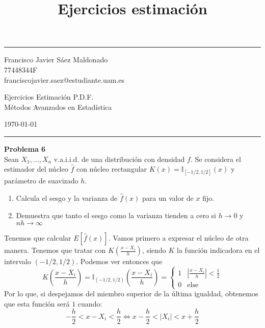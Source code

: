 \documentclass[11pt]{article}
\title{Ejercicios estimación }
\newenvironment{problem}[2][Problema]
    { \begin{mdframed}[backgroundcolor=gray!20] \textbf{#1 #2} \\}
    {  \end{mdframed}}
\begin{document}
    

\fancyhead[C]{}
\hrule \medskip %
\begin{minipage}{0.295\textwidth}
\raggedright
\footnotesize
Francisco Javier Sáez Maldonado \hfill\\
77448344F \hfill\\
franciscojavier.saez@estudiante.uam.es
\end{minipage}
\begin{minipage}{0.4\textwidth}
\centering
\large
Ejercicios Estimación P.D.F.\\
\normalsize
Métodos Avanzados en Estadística\\
\end{minipage}
\begin{minipage}{0.295\textwidth}
\raggedleft
\today\hfill\\
\end{minipage}
\medskip\hrule
\bigskip

    
    \begin{problem}{6}

    
    Sean \(X_1,\dots,X_n\) v.a.i.i.d. de una distribución con densidad
\(f\). Se considera el estimador del núcleo \(\hat{f}\) con núcleo
rectangular \(K(x) = \mathbb I_{[-1/2,1/2]}(x)\) y parámetro de
suavizado \(h\).

\begin{enumerate}
\item Calcula el sesgo y la varianza de \(\hat f(x)\) para un valor de \(x\)
fijo.

\item Demuestra que tanto el sesgo como la varianza tienden a cero si
\(h\to 0\) y \(nh\to \infty\)
\end{enumerate}

    \end{problem}

Tenemos que calcular \(E\left[\hat{f}(x)\right]\). Vamos primero a
expresar el núcleo de otra manera. Tenemos que tratar con $ K\left(
\frac{x - X_i}{h}\right)$, siendo \(K\) la función indicadora en el
intervalo \((-1/2,1/2)\). Podemos ver entonces que \[
 K\left( \frac{x - X_i}{h}\right) = \mathbb I_{(-1/2,1/2)} \left( \frac{x - X_i}{h}\right) = 
 \begin{cases}
 1 & \left| \frac{x - X_i}{h} \right| < \frac{1}{2}\\
 0 & \text{else}
 \end{cases}
\] Por lo que, si despejamos del miembro superior de la última igualdad,
obtenemos que esta función será \(1\) cuando: \[
-\frac{h}{2} < x - X_i < \frac{h}{2} \Longleftrightarrow x - \frac{h}{2} < \lvert X_i \rvert <  x +\frac{h}{2} 
\]
\end{document}
